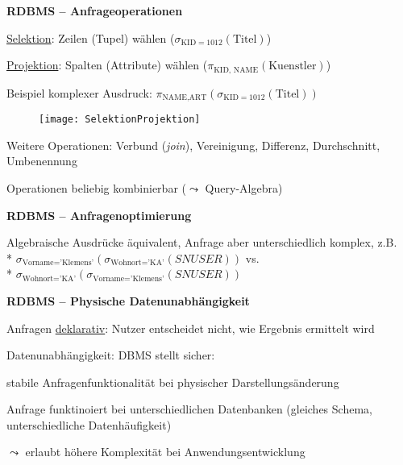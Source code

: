 \textbf{RDBMS -- Anfrageoperationen}
\begin{items}
  \item \underline{Selektion}: Zeilen (Tupel) wählen (\( \sigma_{\text{KID}=1012}(\text{Titel}) \))
  \item \underline{Projektion}: Spalten (Attribute) wählen (\( \pi_{\text{KID, NAME}}(\text{Kuenstler}) \))
  \item Beispiel komplexer Ausdruck: \( \pi_{\text{NAME}, \text{ART}}(\sigma_{\text{KID}=1012}(\text{Titel})) \)
  \begin{figure}[H]\centering\label{SelektionProjektion}\texttt{[image: SelektionProjektion]}\end{figure}
  \item Weitere Operationen: Verbund (\emph{join}), Vereinigung, Differenz, Durchschnitt, Umbenennung
  \item Operationen beliebig kombinierbar (\( \leadsto \) Query-Algebra)
\end{items}

\textbf{RDBMS -- Anfragenoptimierung}
\begin{items}
  \item Algebraische Ausdrücke äquivalent, Anfrage aber unterschiedlich komplex, z.B. \\* \( \sigma_{\text{Vorname} = \text{'Klemens'}}(\sigma_{\text{Wohnort} = \text{'KA'}}(SNUSER)) \) vs. \\* \( \sigma_{\text{Wohnort} = \text{'KA'}}(\sigma_{\text{Vorname} = \text{'Klemens'}}(SNUSER)) \)
\end{items}

\textbf{RDBMS -- Physische Datenunabhängigkeit}
\begin{items}
  \item Anfragen \underline{deklarativ}: Nutzer entscheidet nicht, wie Ergebnis ermittelt wird
  \item Datenunabhängigkeit: DBMS stellt sicher:
  \begin{enumeration}
    \item stabile Anfragenfunktionalität bei physischer Darstellungsänderung
    \item Anfrage funktinoiert bei unterschiedlichen Datenbanken (gleiches Schema, unterschiedliche Datenhäufigkeit)
  \end{enumeration}
  \item \( \leadsto \) erlaubt höhere Komplexität bei Anwendungsentwicklung
\end{items}

